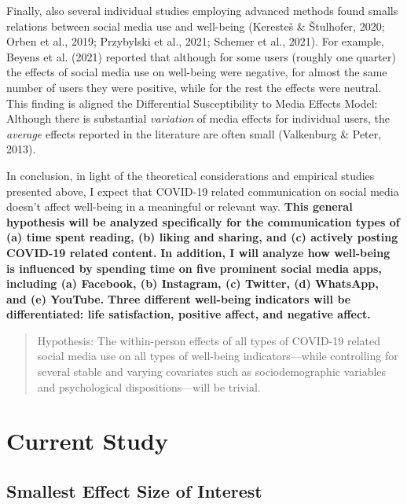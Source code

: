 \documentclass[
  man,mask]{apa7}
\begin{document}
Finally, also several individual studies employing advanced methods found smalls relations between social media use and well-being (Keresteš \& Štulhofer, 2020; Orben et al., 2019; Przybylski et al., 2021; Schemer et al., 2021).
For example, Beyens et al. (2021) reported that although for some users (roughly one quarter) the effects of social media use on well-being were negative, for almost the same number of users they were positive, while for the rest the effects were neutral.
This finding is aligned the Differential Susceptibility to Media Effects Model:
Although there is substantial \emph{variation} of media effects for individual users, the \emph{average} effects reported in the literature are often small (Valkenburg \& Peter, 2013).

In conclusion, in light of the theoretical considerations and empirical studies presented above, I expect that COVID-19 related communication on social media doesn't affect well-being in a meaningful or relevant way.
\textbf{This general hypothesis will be analyzed specifically for the communication types of (a) time spent reading, (b) liking and sharing, and (c) actively posting COVID-19 related content.}
\textbf{In addition, I will analyze how well-being is influenced by spending time on five prominent social media apps, including (a) Facebook, (b) Instagram, (c) Twitter, (d) WhatsApp, and (e) YouTube.}
\textbf{Three different well-being indicators will be differentiated: life satisfaction, positive affect, and negative affect.}

\begin{quote}
Hypothesis: The within-person effects of all types of COVID-19 related social media use on all types of well-being indicators---while controlling for several stable and varying covariates such as sociodemographic variables and psychological dispositions---will be trivial.
\end{quote}

\hypertarget{current-study}{%
\section{Current Study}\label{current-study}}

\hypertarget{smallest-effect-size-of-interest}{%
\subsection{Smallest Effect Size of Interest}\label{smallest-effect-size-of-interest}}
\end{document}
